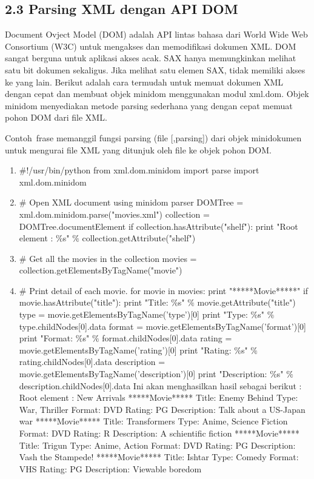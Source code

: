 \subsection{2.3 Parsing XML dengan API DOM} 
Document Ovject Model (DOM) adalah API lintas bahasa dari World Wide Web Consortium (W3C) untuk mengakses dan memodifikasi dokumen XML.  DOM sangat berguna untuk aplikasi akses acak. SAX hanya memungkinkan melihat satu bit dokumen sekaligus. Jika melihat satu elemen SAX, tidak memiliki akses ke yang lain. Berikut adalah cara termudah untuk memuat dokumen XML dengan cepat dan membuat objek minidom menggunakan modul xml.dom. Objek minidom menyediakan metode parsing sederhana yang dengan cepat memuat pohon DOM dari file XML. \par
Contoh~frase memanggil fungsi  parsing (file [,parsing]) dari objek minidokumen untuk mengurai file XML yang ditunjuk oleh file ke objek pohon DOM.
\begin{enumerate}
\item $  \#  $!/usr/bin/python
from xml.dom.minidom import parse 
import xml.dom.minidom 
\item $  \#  $ Open XML document using minidom parser
DOMTree = xml.dom.minidom.parse("movies.xml") 
collection = DOMTree.documentElement 
if collection.hasAttribute("shelf"): 
print "Root element :  $  \%  $s"  $  \%  $ collection.getAttribute("shelf") 
\item $  \#  $ Get all the movies in the collection 
movies = collection.getElementsByTagName("movie") 
\item $  \#  $ Print detail of each movie. 
for movie in movies: 
print "*****Movie*****" 
if movie.hasAttribute("title"): 
print "Title:  $  \%  $s"  $  \%  $ movie.getAttribute("title") 
type = movie.getElementsByTagName('type')[0] 
print "Type:  $  \%  $s"  $  \%  $ type.childNodes[0].data 
format = movie.getElementsByTagName('format')[0] 
print "Format:  $  \%  $s"  $  \%  $ format.childNodes[0].data 
rating = movie.getElementsByTagName('rating')[0] 
print "Rating:  $  \%  $s"  $  \%  $ rating.childNodes[0].data 
description = movie.getElementsByTagName('description')[0] 
print "Description:  $  \%  $s"  $  \%  $ description.childNodes[0].data 
Ini akan menghasilkan hasil sebagai berikut : 
Root element : New Arrivals 
*****Movie***** 
Title: Enemy Behind 
Type: War, Thriller 
Format: DVD 
Rating: PG 
Description: Talk about a US-Japan war 
*****Movie***** 
Title: Transformers 
Type: Anime, Science Fiction 
Format: DVD 
Rating: R 
Description: A schientific fiction 
*****Movie***** 
Title: Trigun 
Type: Anime, Action 
Format: DVD 
Rating: PG 
Description: Vash the Stampede! 
*****Movie***** 
Title: Ishtar 
Type: Comedy 
Format: VHS 
Rating: PG
Description: Viewable boredom 
\end{enumerate}

